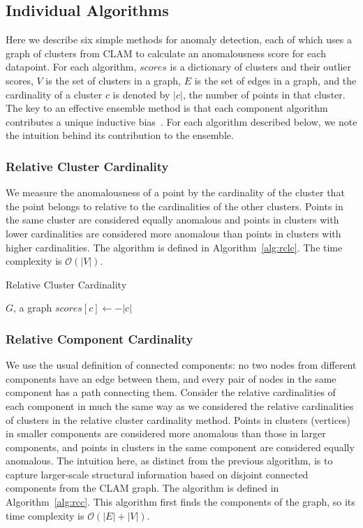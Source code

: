 \subsection{Individual Algorithms}
\label{subsec:methods:individual-algorithms}

Here we describe six simple methods for anomaly detection, each of which uses a graph of clusters from CLAM to calculate an anomalousness score for each datapoint.
For each algorithm, $scores$ is a dictionary of clusters and their outlier scores,
$V$ is the set of clusters in a graph,
$E$ is the set of edges in a graph, and
the cardinality of a cluster $c$ is denoted by $|c|$, the number of points in that cluster.
The key to an effective ensemble method is that each component algorithm contributes a unique inductive bias~\cite{chen2017outlier}.
For each algorithm described below, we note the intuition behind its contribution to the ensemble.

\subsubsection{Relative Cluster Cardinality}
We measure the anomalousness of a point by the cardinality of the cluster that the point belongs to relative to the cardinalities of the other clusters.
Points in the same cluster are considered equally anomalous and points in clusters with lower cardinalities are considered more anomalous than points in clusters with higher cardinalities.
The algorithm is defined in Algorithm~\ref{alg:rclc}.
The time complexity is $\mathcal{O}(|V|)$.

\begin{algorithm}[h]
    \caption{Relative Cluster Cardinality}
    \label{alg:rclc}
\begin{algorithmic}[1]
    \REQUIRE $G$, a graph
    \STATE $scores[c] \gets -|c|$
    \ENDFOR
\end{algorithmic}
\end{algorithm}

\subsubsection{Relative Component Cardinality}
We use the usual definition of connected components:
no two nodes from different components have an edge between them, and
every pair of nodes in the same component has a path connecting them.
Consider the relative cardinalities of each component in much the same way as we considered the relative cardinalities of clusters in the relative cluster cardinality method.
Points in clusters (vertices) in smaller components are considered more anomalous than those in larger components,
and points in clusters in the same component are considered equally anomalous.
The intuition here, as distinct from the previous algorithm, is to capture larger-scale structural information based on disjoint connected components from the CLAM graph.
The algorithm is defined in Algorithm~\ref{alg:rcc}.
This algorithm first finds the components of the graph, so its time complexity is $\mathcal{O}(|E| + |V|)$.

